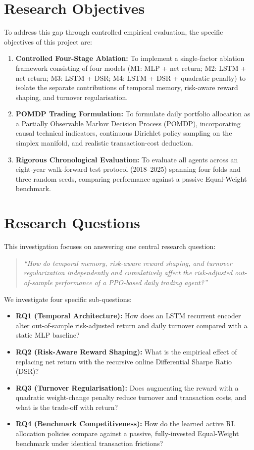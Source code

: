 \section{Research Objectives}
To address this gap through controlled empirical evaluation, the specific objectives of this project are:
\begin{enumerate}
    \setlength{\itemsep}{1pt}
    \item \textbf{Controlled Four-Stage Ablation:} To implement a single-factor ablation framework consisting of four models (M1: MLP + net return; M2: LSTM + net return; M3: LSTM + DSR; M4: LSTM + DSR + quadratic penalty) to isolate the separate contributions of temporal memory, risk-aware reward shaping, and turnover regularisation.
    \item \textbf{POMDP Trading Formulation:} To formulate daily portfolio allocation as a Partially Observable Markov Decision Process (POMDP), incorporating causal technical indicators, continuous Dirichlet policy sampling on the simplex manifold, and realistic transaction-cost deduction.
    \item \textbf{Rigorous Chronological Evaluation:} To evaluate all agents across an eight-year walk-forward test protocol (2018--2025) spanning four folds and three random seeds, comparing performance against a passive Equal-Weight benchmark.
\end{enumerate}

\section{Research Questions}
This investigation focuses on answering one central research question:
\begin{quote}
\itshape
``How do temporal memory, risk-aware reward shaping, and turnover regularization independently and cumulatively affect the risk-adjusted out-of-sample performance of a PPO-based daily trading agent?''
\end{quote}
We investigate four specific sub-questions:
\begin{itemize}
    \setlength{\itemsep}{1pt}
    \item \textbf{RQ1 (Temporal Architecture):} How does an LSTM recurrent encoder alter out-of-sample risk-adjusted return and daily turnover compared with a static MLP baseline?
    \item \textbf{RQ2 (Risk-Aware Reward Shaping):} What is the empirical effect of replacing net return with the recursive online Differential Sharpe Ratio (DSR)?
    \item \textbf{RQ3 (Turnover Regularisation):} Does augmenting the reward with a quadratic weight-change penalty reduce turnover and transaction costs, and what is the trade-off with return?
    \item \textbf{RQ4 (Benchmark Competitiveness):} How do the learned active RL allocation policies compare against a passive, fully-invested Equal-Weight benchmark under identical transaction frictions?
\end{itemize}

